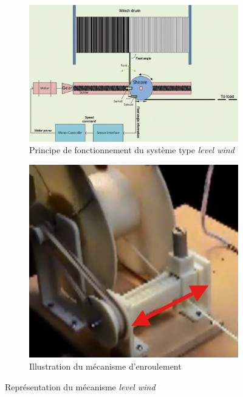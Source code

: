 \documentclass[a4paper, 11pt]{report}
\begin{document}
            \begin{figure}[htbp]
                \centering
                \begin{subfigure}[t]{0.6\textwidth}
                    \centering
                    \includegraphics[width=\textwidth]{Figures/level_wind.png}
                    \caption{Principe de fonctionnement du système type \textit{level wind} \cite{mortensen_precision_2014}}
                    \label{fig:level_wind}
                \end{subfigure}
                \hfill
                \begin{subfigure}[t]{0.3\textwidth}
                    \centering
                    \includegraphics[width=\textwidth]{Figures/video.png}
                    \caption{Illustration du mécanisme d'enroulement \cite{hugh_lyman_level_2014}}
                    \label{fig:video}
                \end{subfigure}
                \caption{Représentation du mécanisme \textit{level wind}}
            \end{figure}
\end{document}
